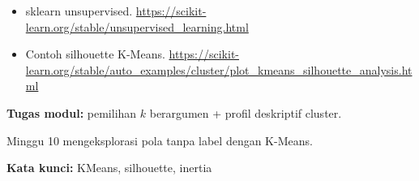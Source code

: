 \documentclass[../main.tex]{subfiles}
\begin{document}
\begin{itemize}[leftmargin=*]
  \item sklearn unsupervised. \url{https://scikit-learn.org/stable/unsupervised_learning.html}
  \item Contoh silhouette K-Means. \url{https://scikit-learn.org/stable/auto_examples/cluster/plot_kmeans_silhouette_analysis.html}
\end{itemize}

\begin{asesmen}
\textbf{Tugas modul:} pemilihan $k$ berargumen + profil deskriptif cluster.
\end{asesmen}

\begin{rangkuman}
Minggu 10 mengeksplorasi pola tanpa label dengan K-Means.

\textbf{Kata kunci:} KMeans, silhouette, inertia
\end{rangkuman}
\end{document}
